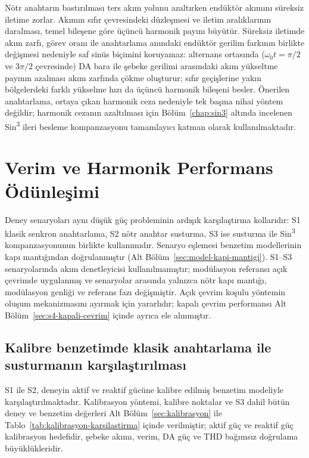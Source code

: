 Nötr anahtarın bastırılması ters akım yolunu azaltırken endüktör akımını süreksiz iletime zorlar. Akımın sıfır çevresindeki düzleşmesi ve iletim aralıklarının daralması, temel bileşene göre üçüncü harmonik payını büyütür. Süreksiz iletimde akım zarfı, görev oranı ile anahtarlama anındaki endüktör gerilim farkının birlikte değişmesi nedeniyle saf sinüs biçimini koruyamaz: alternans ortasında ($\omega_0t=\pi/2$ ve $3\pi/2$ çevresinde) DA bara ile şebeke gerilimi arasındaki akım yükseltme payının azalması akım zarfında çökme oluşturur; sıfır geçişlerine yakın bölgelerdeki farklı yükselme hızı da üçüncü harmonik bileşeni besler. Önerilen anahtarlama, ortaya çıkan harmonik ceza nedeniyle tek başına nihai yöntem değildir; harmonik cezanın azaltılması için Bölüm~\ref{chap:sin3} altında incelenen Sin\textsuperscript{3} ileri besleme kompanzasyonu tamamlayıcı katman olarak kullanılmaktadır.

\section{Verim ve Harmonik Performans Ödünleşimi}

Deney senaryoları aynı düşük güç probleminin ardışık karşılaştırma kollarıdır: S1 klasik senkron anahtarlama, S2 nötr anahtar susturma, S3 ise susturma ile Sin\textsuperscript{3} kompanzasyonunun birlikte kullanımıdır. Senaryo eşlemesi benzetim modellerinin kapı mantığından doğrulanmıştır (Alt Bölüm~\ref{sec:model-kapi-mantigi}). S1--S3 senaryolarında akım denetleyicisi kullanılmamıştır; modülasyon referansı açık çevrimde uygulanmış ve senaryolar arasında yalnızca nötr kapı mantığı, modülasyon genliği ve referans fazı değişmiştir. Açık çevrim koşulu yöntemin oluşum mekanizmasını ayırmak için yararlıdır; kapalı çevrim performansı Alt Bölüm~\ref{sec:s4-kapali-cevrim} içinde ayrıca ele alınmıştır.

\subsection{Kalibre benzetimde klasik anahtarlama ile susturmanın karşılaştırılması}
\label{sec:s1-s2-kalibre}

S1 ile S2, deneyin aktif ve reaktif gücüne kalibre edilmiş benzetim modeliyle karşılaştırılmaktadır. Kalibrasyon yöntemi, kalibre noktalar ve S3 dahil bütün deney ve benzetim değerleri Alt Bölüm~\ref{sec:kalibrasyon} ile Tablo~\ref{tab:kalibrasyon-karsilastirma} içinde verilmiştir; aktif güç ve reaktif güç kalibrasyon hedefidir, şebeke akımı, verim, DA güç ve THD bağımsız doğrulama büyüklükleridir.

